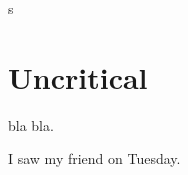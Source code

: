 \documentclass{memoir}
\begin{document}
\meaning\edtext

s


\makeatother


\section{Uncritical}%
bla bla.

\beginnumbering
\pstart
{}
\pend
\pstart I saw my friend   on Tuesday.
\pend
\endnumbering
\end{document}
